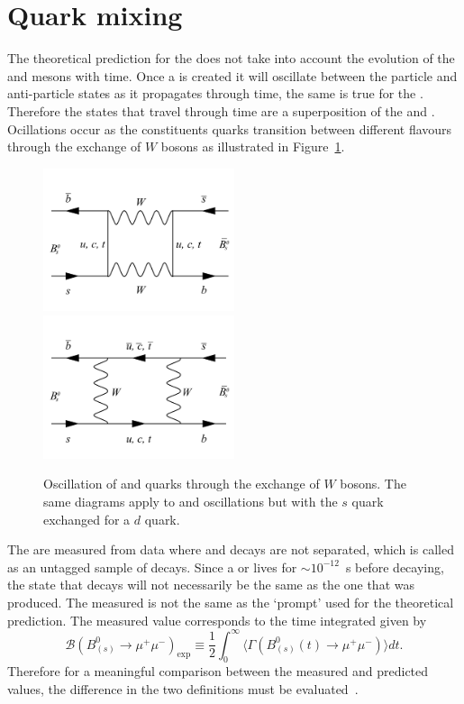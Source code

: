 {\section{Quark mixing}
\label{sec:quarkmaixing}
The theoretical prediction for the \bmumu \BFs does not take into account the evolution of the \bsd and \barbsd mesons with time. Once a \bsd is created it will oscillate between the particle and anti-particle states as it propagates through time, the same is true for the \barbsd. Therefore the states that travel through time are a superposition of the \bsd and \barbsd. Ocillations occur as the constituents quarks transition between different flavours through the exchange of $W$ bosons as illustrated in Figure~\ref{fig:Oscl_diag}.
\begin{figure}[htbp]
    \centering
        \includegraphics[width=0.5\textwidth]{./Figs/Theory/Oscillation_1.pdf}
        \includegraphics[width=0.5\textwidth]{./Figs/Theory/Oscillation_2.pdf}
    \caption{Oscillation of \bs and \barbs quarks through the exchange of $W$ bosons. The same diagrams apply to \bd and \barbd oscillations but with the $s$ quark exchanged for a $d$ quark.}
    \label{fig:Oscl_diag}
\end{figure}
The \BFs are measured from data where \bsd and \barbsd decays are not separated, which is called as an untagged sample of \bmumu decays. Since a \bsd or \barbsd lives for $\sim 10^{-12}$~s before decaying, the state that decays will not necessarily be the same as the one that was produced. The measured \BF is not the same as the `prompt' \BF used for the theoretical prediction. The measured value corresponds to the time integrated \BF given by~\cite{DeBruyn:2012wj}
\begin{equation}
  \mathcal{B}(B^0_{(s)} \to \mu^+ \mu^-)_{\mathrm{exp}} \equiv \frac{1}{2} \int^{\infty}_0 \langle \Gamma(B^0_{(s)}(t) \to \mu^+\mu^-) \rangle dt.
\label{eq:time_BF}
\end{equation}
Therefore for a meaningful comparison between the measured and predicted \BF values, the difference in the two definitions must be evaluated~\cite{DeBruyn:2012wk,Buras:2013uqa,DeBruyn:2012wj}.

}
